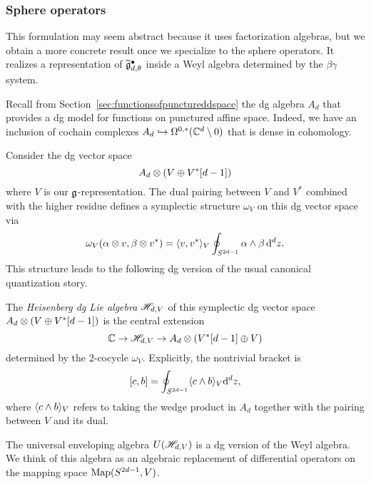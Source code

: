 \subsubsection{Sphere operators}

This formulation may seem abstract because it uses factorization algebras,
but we obtain a more concrete result once we specialize to the sphere operators. 
It realizes a representation of $\widetilde{\mathfrak g}^\bullet_{d,\theta}$ inside a Weyl algebra determined by  the $\beta\gamma$ system.

Recall from Section~\ref{sec:functionsofpunctureddspace} the dg algebra $A_d$ that provides a dg model for functions on punctured affine space.
Indeed, we have an inclusion of cochain complexes $A_d \hookrightarrow \Omega^{0,*}(\mathbb C^d \setminus 0)$ that is dense in cohomology.

Consider the dg vector space
\[
A_d \otimes (V \oplus V^*[d-1])
\]
where $V$ is our $\mathfrak g$-representation. 
The dual pairing between $V$ and $V^*$ combined with the higher residue defines a symplectic structure $\omega_V$ on this dg vector space via
\[
\omega_V(\alpha \otimes v, \beta \otimes v^*) = \langle v, v^*\rangle_V \oint_{S^{2d-1}} \alpha \wedge \beta\, {\rm d}^d z .
\]
This structure leads to the following dg version of the usual canonical quantization story.

\begin{dfn}
The {\em Heisenberg dg Lie algebra} $\mathscr H_{d,V}$ of this symplectic dg vector space $A_d \otimes (V \oplus V^*[d-1])$ is the central extension
\[
\mathbb C \to \mathscr H_{d,V} \to A_d \otimes (V^*[d-1] \oplus V) 
\]
determined by the $2$-cocycle $\omega_V$. 
Explicitly, the nontrivial bracket is
\[
[c, b] =  \oint_{S^{2d-1}} \langle c \wedge b\rangle_V {\rm d}^d z,
\]
where $\langle c \wedge b\rangle_V$ refers to taking the wedge product in $A_d$ together with the pairing between $V$ and its dual. 
\end{dfn}

The universal enveloping algebra $U(\mathscr H_{d,V})$ is a dg version of the Weyl algebra.
We think of this algebra as an algebraic replacement of differential operators on the mapping space ${\rm Map}(S^{2d-1},V)$.

